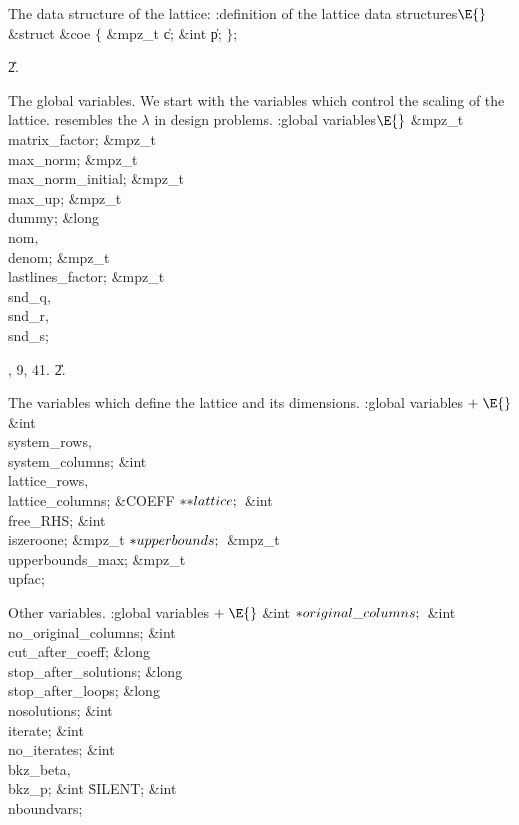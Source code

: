 The data structure of the lattice:
\Y\B\4:definition of the lattice data structures\X${}\E{}$\6
\&{struct} \&{coe} ${}\{{}$\1\6
\&{mpz\_t} \|c;\6
\&{int} \|p;\2\6
${}\}{}$;\par
\U2.\fi

The global variables.
We start with the
variables which control the scaling of the lattice.
 resembles the $\lambda$ in design problems.
\Y\B\4:global variables\X${}\E{}$\6
\&{mpz\_t} \\{matrix\_factor};\6
\&{mpz\_t} \\{max\_norm};\6
\&{mpz\_t} \\{max\_norm\_initial};\6
\&{mpz\_t} \\{max\_up};\6
\&{mpz\_t} \\{dummy};\6
\&{long} \\{nom}${},{}$ \\{denom};\6
\&{mpz\_t} \\{lastlines\_factor};\6
\&{mpz\_t} \\{snd\_q}${},{}$ \\{snd\_r}${},{}$ \\{snd\_s};\par
{}, 9, 41.
\U2.\fi

The variables which define the lattice and its dimensions.
\Y\B\4:global variables\X${}\mathrel+\E{}$\6
\&{int} \\{system\_rows}${},{}$ \\{system\_columns};\6
\&{int} \\{lattice\_rows}${},{}$ \\{lattice\_columns};\6
\&{COEFF} ${}{*}{*}\\{lattice};{}$\6
\&{int} \\{free\_RHS};\6
\&{int} \\{iszeroone};\6
\&{mpz\_t} ${}{*}\\{upperbounds};{}$\6
\&{mpz\_t} \\{upperbounds\_max};\6
\&{mpz\_t} \\{upfac};\par
\fi

Other variables.
\Y\B\4:global variables\X${}\mathrel+\E{}$\6
\&{int} ${}{*}\\{original\_columns};{}$\6
\&{int} \\{no\_original\_columns};\6
\&{int} \\{cut\_after\_coeff};\6
\&{long} \\{stop\_after\_solutions};\6
\&{long} \\{stop\_after\_loops};\6
\&{long} \\{nosolutions};\6
\&{int} \\{iterate};\6
\&{int} \\{no\_iterates};\6
\&{int} \\{bkz\_beta}${},{}$ \\{bkz\_p};\6
\&{int} \.{SILENT};\6
\&{int} \\{nboundvars};\par
\fi

